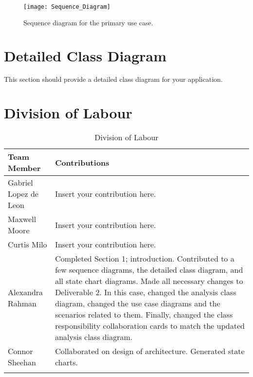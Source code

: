 \documentclass[titlepage]{article}
\begin{document}
\begin{figure}
\texttt{[image: Sequence\_Diagram]}
\caption{Sequence diagram for the primary use case.}\label{sd:main}
\end{figure}

\section{Detailed Class Diagram}
\label{sec:detailed_class_diagram}
This section should provide a detailed class diagram for your application.

\pagebreak
\appendix
\section{Division of Labour}
\label{sec:division_of_labour}

\begin{longtable}{| p{} | p{} |}
			\hline
			\textbf {Team Member} & \textbf{Contributions}\\ 
			\hline
			Gabriel Lopez de Leon & Insert your contribution here.
			\\
			\hline
			Maxwell Moore & Insert your contribution here.
			\\
			\hline
			Curtis Milo & Insert your contribution here.
			\\ 
			\hline
			Alexandra Rahman & Completed Section 1; introduction. Contributed to a few sequence diagrams, the detailed class diagram, and all state chart diagrams. Made all necessary changes to Deliverable 2. In this case, changed the analysis class diagram, changed the use case diagrams and the scenarios related to them. Finally, changed the class responsibility collaboration cards to match the updated analysis class diagram.
			\\
			\hline
			Connor Sheehan & Collaborated on design of architecture. Generated state charts.
			\\
			\hline
			
			\caption{Division of Labour}
	\end{longtable}
\end{document}
